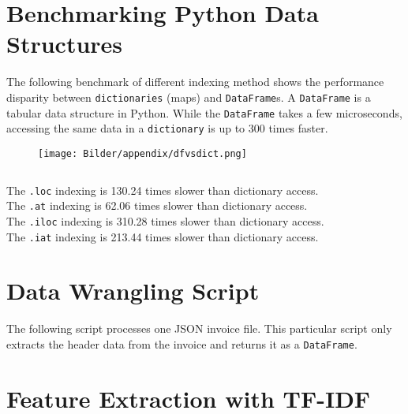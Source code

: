 \section{Benchmarking Python Data Structures}
\label{benchmarkDF}

The following benchmark of different indexing method shows the performance disparity between \lstinline|dictionaries| (maps) and \lstinline|DataFrame|s. A \lstinline|DataFrame| is a tabular data structure in Python. While the \lstinline|DataFrame| takes a few microseconds, accessing the same data in a \lstinline|dictionary| is up to 300 times faster.

\begin{figure}[h!]
	\texttt{[image: Bilder/appendix/dfvsdict.png]}
\end{figure}
\begin{lstlisting}[caption={Benchmark of Indexing with Python Data Structures}]
\end{lstlisting}
The \lstinline|.loc| indexing is  130.24 times slower than dictionary access.\\
The \lstinline|.at|  indexing is  62.06 times slower than dictionary access.\\
The \lstinline|.iloc|  indexing is  310.28 times slower than dictionary access.\\
The \lstinline|.iat|  indexing is  213.44 times slower than dictionary access.

\newpage
\section{Data Wrangling Script}
The following script processes one \ac{JSON} invoice file. This particular script only extracts the header data from the invoice and returns it as a \lstinline|DataFrame|.



\newpage

\section{Feature Extraction with \acs{TF-IDF}}
\label{appendix:tfidf}

